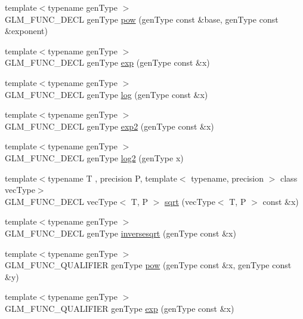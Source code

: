 \begin{DoxyCompactItemize}
\item 
{\footnotesize template$<$typename gen\-Type $>$ }\\G\-L\-M\-\_\-\-F\-U\-N\-C\-\_\-\-D\-E\-C\-L gen\-Type \hyperlink{group__core__func__exponential_ga1ce4b2fddd26d0d3a35a8d98f37f3ac0}{pow} (gen\-Type const \&base, gen\-Type const \&exponent)
\item 
{\footnotesize template$<$typename gen\-Type $>$ }\\G\-L\-M\-\_\-\-F\-U\-N\-C\-\_\-\-D\-E\-C\-L gen\-Type \hyperlink{group__core__func__exponential_gae154699ba6bda068d4b87cf9b987381f}{exp} (gen\-Type const \&x)
\item 
{\footnotesize template$<$typename gen\-Type $>$ }\\G\-L\-M\-\_\-\-F\-U\-N\-C\-\_\-\-D\-E\-C\-L gen\-Type \hyperlink{group__core__func__exponential_ga0c8da2d2921da250e8700ac4476916a1}{log} (gen\-Type const \&x)
\item 
{\footnotesize template$<$typename gen\-Type $>$ }\\G\-L\-M\-\_\-\-F\-U\-N\-C\-\_\-\-D\-E\-C\-L gen\-Type \hyperlink{group__core__func__exponential_gac45997fb3ac907cad408d6da0a0f5f54}{exp2} (gen\-Type const \&x)
\item 
{\footnotesize template$<$typename gen\-Type $>$ }\\G\-L\-M\-\_\-\-F\-U\-N\-C\-\_\-\-D\-E\-C\-L gen\-Type \hyperlink{group__core__func__exponential_gad41e336e9bc8190fe99d2cfd9261c19b}{log2} (gen\-Type x)
\item 
{\footnotesize template$<$typename T , precision P, template$<$ typename, precision $>$ class vec\-Type$>$ }\\G\-L\-M\-\_\-\-F\-U\-N\-C\-\_\-\-D\-E\-C\-L vec\-Type$<$ T, P $>$ \hyperlink{group__core__func__exponential_ga2ea6c6738ad6e09ec3405a628047801b}{sqrt} (vec\-Type$<$ T, P $>$ const \&x)
\item 
{\footnotesize template$<$typename gen\-Type $>$ }\\G\-L\-M\-\_\-\-F\-U\-N\-C\-\_\-\-D\-E\-C\-L gen\-Type \hyperlink{group__core__func__exponential_ga5ac08ead2e50ad0295b9ad85a3e449e9}{inversesqrt} (gen\-Type const \&x)
\item 
{\footnotesize template$<$typename gen\-Type $>$ }\\G\-L\-M\-\_\-\-F\-U\-N\-C\-\_\-\-Q\-U\-A\-L\-I\-F\-I\-E\-R gen\-Type \hyperlink{group__core__func__exponential_ga1ce4b2fddd26d0d3a35a8d98f37f3ac0}{pow} (gen\-Type const \&x, gen\-Type const \&y)
\item 
{\footnotesize template$<$typename gen\-Type $>$ }\\G\-L\-M\-\_\-\-F\-U\-N\-C\-\_\-\-Q\-U\-A\-L\-I\-F\-I\-E\-R gen\-Type \hyperlink{group__core__func__exponential_gae154699ba6bda068d4b87cf9b987381f}{exp} (gen\-Type const \&x)

\end{DoxyCompactItemize}
